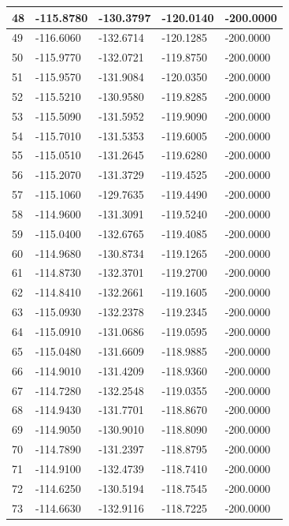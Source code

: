 \begin{longtable}{|l|l|l|l|l|}
48 & -115.8780 & -130.3797 & -120.0140 & -200.0000 \\\hline
49 & -116.6060 & -132.6714 & -120.1285 & -200.0000 \\\hline
50 & -115.9770 & -132.0721 & -119.8750 & -200.0000 \\\hline
51 & -115.9570 & -131.9084 & -120.0350 & -200.0000 \\\hline
52 & -115.5210 & -130.9580 & -119.8285 & -200.0000 \\\hline
53 & -115.5090 & -131.5952 & -119.9090 & -200.0000 \\\hline
54 & -115.7010 & -131.5353 & -119.6005 & -200.0000 \\\hline
55 & -115.0510 & -131.2645 & -119.6280 & -200.0000 \\\hline
56 & -115.2070 & -131.3729 & -119.4525 & -200.0000 \\\hline
57 & -115.1060 & -129.7635 & -119.4490 & -200.0000 \\\hline
58 & -114.9600 & -131.3091 & -119.5240 & -200.0000 \\\hline
59 & -115.0400 & -132.6765 & -119.4085 & -200.0000 \\\hline
60 & -114.9680 & -130.8734 & -119.1265 & -200.0000 \\\hline
61 & -114.8730 & -132.3701 & -119.2700 & -200.0000 \\\hline
62 & -114.8410 & -132.2661 & -119.1605 & -200.0000 \\\hline
63 & -115.0930 & -132.2378 & -119.2345 & -200.0000 \\\hline
64 & -115.0910 & -131.0686 & -119.0595 & -200.0000 \\\hline
65 & -115.0480 & -131.6609 & -118.9885 & -200.0000 \\\hline
66 & -114.9010 & -131.4209 & -118.9360 & -200.0000 \\\hline
67 & -114.7280 & -132.2548 & -119.0355 & -200.0000 \\\hline
68 & -114.9430 & -131.7701 & -118.8670 & -200.0000 \\\hline
69 & -114.9050 & -130.9010 & -118.8090 & -200.0000 \\\hline
70 & -114.7890 & -131.2397 & -118.8795 & -200.0000 \\\hline
71 & -114.9100 & -132.4739 & -118.7410 & -200.0000 \\\hline
72 & -114.6250 & -130.5194 & -118.7545 & -200.0000 \\\hline
73 & -114.6630 & -132.9116 & -118.7225 & -200.0000 \\\hline

\end{longtable}
